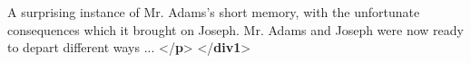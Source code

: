 \begin{shaded}
\hspace*{1em}A surprising instance of Mr. Adams's short memory, with the\mbox{}\newline 
\hspace*{1em}\hspace*{1em}\hspace*{1em}\hspace*{1em} unfortunate consequences which it brought on Joseph.\mbox{}\newline 
\hspace*{1em}\mbox{}\newline 
\hspace*{1em}Mr. Adams and Joseph were now ready to depart different ways ... {</\textbf{p}>}\mbox{}\newline 
{}\mbox{}\newline 
{</\textbf{div1}>}\end{shaded}\egroup\par \noindent  \par
